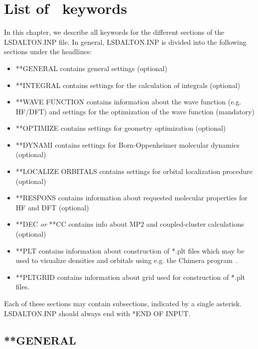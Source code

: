 
\chapter{List of \lsdalton\ keywords}\label{ch:keywords}

In this chapter, we describe all keywords for the different sections
of the LSDALTON.INP file. In general, LSDALTON.INP is divided into the following sections under
the headlines:
\begin{itemize}
\item **GENERAL contains general settings (optional)
\item **INTEGRAL contains settings for the calculation of integrals (optional)
\item **WAVE FUNCTION contains information about the wave function (e.g. HF/DFT) and settings
for the optimization of the wave function (mandatory)
\item **OPTIMIZE contains settings for geometry optimization (optional)
\item **DYNAMI contains settings for Born-Oppenheimer molecular dynamics (optional)
\item **LOCALIZE ORBITALS contains settings for orbital localization procedure (optional)
\item **RESPONS contains information about requested molecular properties for HF and DFT (optional)
\item **DEC \emph{or} **CC contains info about MP2 and coupled-cluster calculations (optional)
\item **PLT contains information about construction of *.plt files which may be used to visualize densities and orbitals using e.g. the Chimera program~\cite{chimera}.
\item **PLTGRID contains information about grid used for construction of *.plt files.
\end{itemize}
Each of these sections may contain subsections, indicated by a single asterisk. LSDALTON.INP
should always end with *END OF INPUT. 

\section{**GENERAL}\label{sec:general}

